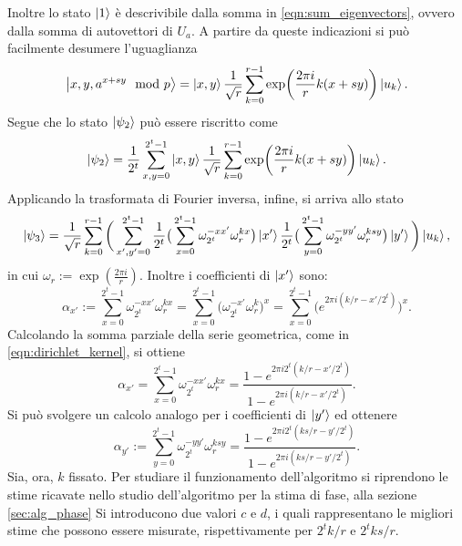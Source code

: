 Inoltre lo stato $\ket{1}$ è descrivibile dalla somma in \eqref{eqn:sum_eigenvectors}, ovvero dalla somma di autovettori di $U_a$.
A partire da queste indicazioni si può facilmente desumere l'uguaglianza
\begin{equation}
 \ket{x,y,a^{x+sy} \mod p} = \ket{x,y} \frac{1}{\sqrt{r}}\sum_{k=0}^{r-1} \exp(\frac{2 \pi i}{r} k(x+sy)) \ket{u_k}.
\end{equation}
Segue che lo stato $\ket{\psi_2}$ può essere riscritto come
\begin{equation}
 \ket{\psi_2} = \frac{1}{2^t}\sum_{x,y = 0}^{2^t-1} \ket{x,y} \frac{1}{\sqrt{r}}\sum_{k=0}^{r-1} \exp(\frac{2 \pi i}{r} k(x+sy)) \ket{u_k}.
\end{equation}
Applicando la trasformata di Fourier inversa, infine, si arriva allo stato
\begin{equation}\label{eqn:DLP_last_state}
 \ket{\psi_3} = \frac{1}{\sqrt{r}}\sum_{k=0}^{r-1} \bigg(
  \sum_{x',y' = 0}^{2^t-1}
  \frac{1}{2^t}\big(\sum_{x = 0}^{2^t-1} \omega_{2^t}^{-xx'}\omega_{r}^{kx} \big) \ket{x'}
  \frac{1}{2^t}\big(\sum_{y = 0}^{2^t-1} \omega_{2^t}^{-yy'}\omega_{r}^{ksy}\big) \ket{y'}
 \bigg) \ket{u_k},
\end{equation}
in cui $\omega_r := \exp(\frac{2 \pi i}{r})$. Inoltre i coefficienti di $\ket{x'}$ sono:
\begin{equation}
 \alpha_{x'} :=
 \sum_{x = 0}^{2^t-1} \omega_{2^t}^{-xx'}\omega_{r}^{kx} = 
 \sum_{x = 0}^{2^t-1} \big(\omega_{2^t}^{-x'}\omega_{r}^{k} \big)^x =
 \sum_{x = 0}^{2^t-1} \big(e^{2 \pi i (k/r - x'/2^t)} \big)^x.
\end{equation}
Calcolando la somma parziale della serie geometrica, come in \eqref{eqn:dirichlet_kernel}, si ottiene
\begin{equation}
 \alpha_{x'} =
 \sum_{x = 0}^{2^t-1} \omega_{2^t}^{-xx'}\omega_{r}^{kx} = 
 \frac{1 - e^{2 \pi i 2^t(k/r - x'/2^t)}}{1 - e^{2 \pi i (k/r - x'/2^t)}}.
\end{equation}
Si può svolgere un calcolo analogo per i coefficienti di $\ket{y'}$ ed ottenere
\begin{equation}
 \alpha_{y'} :=
 \sum_{y = 0}^{2^t-1} \omega_{2^t}^{-yy'}\omega_{r}^{ksy} = 
 \frac{1 - e^{2 \pi i 2^t(ks/r - y'/2^t)}}{1 - e^{2 \pi i (ks/r - y'/2^t)}}.
\end{equation}
Sia, ora, $k$ fissato. 
Per studiare il funzionamento dell'algoritmo si riprendono le stime ricavate nello studio dell'algoritmo per la stima di fase, alla sezione \ref{sec:alg_phase}
Si introducono due valori $c$ e $d$, i quali rappresentano le migliori stime che possono essere misurate, rispettivamente per $2^tk/r$ e $2^tks/r$.
